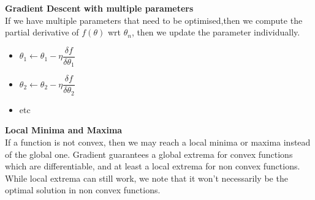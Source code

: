 \documentclass[a4paper,10pt]{article}
\begin{document}
\noindent \textcolor{Periwinkle}{\textbf{Gradient Descent with multiple parameters}}\\
If we have multiple parameters that need to be optimised,then we compute the partial derivative of $f(\theta)$ wrt $\theta_{n}$, then we update the parameter individually. 
\begin{itemize}
	\item $\theta_{1} \leftarrow \theta_{1} -\eta \dfrac{\delta f}{\delta \theta_{1}}$
	\item $\theta_{2} \leftarrow \theta_{2} -\eta \dfrac{\delta f}{\delta \theta_{2}}$
	\item etc
\end{itemize}
\textcolor{Periwinkle}{\textbf{Local Minima and Maxima}}\\
If a function is not convex, then we may reach a local minima or maxima instead of the global one. Gradient guarantees a global extrema for convex functions which are differentiable, and at least a local extrema for non convex functions. While local extrema can still work, we note that it won't necessarily be the optimal solution in non convex functions. \\\\
\newpage
\end{document}
